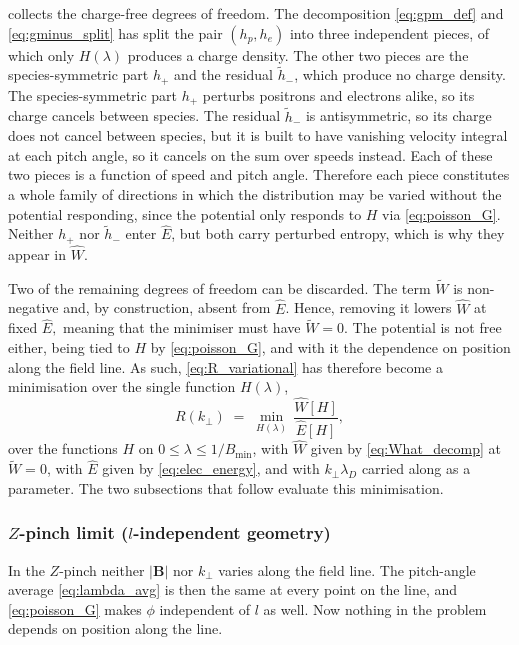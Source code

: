 \documentclass{jpp}
\newcommand{\bB}{\mathbf{B}}
\newcommand{\kperp}{k_\perp}
\newcommand{\lambdaD}{\lambda_D}
\begin{document}
collects the charge-free degrees of freedom. The decomposition \cref{eq:gpm_def} and \cref{eq:gminus_split} has split the pair $(h_p, h_e)$ into three independent pieces, of which only $H(\lambda)$ produces a charge density. The other two pieces are the species-symmetric part $h_+$ and the residual $\tilde h_-$, which produce no charge density. The species-symmetric part $h_+$ perturbs positrons and electrons alike, so its charge cancels between species. The residual $\tilde h_-$ is antisymmetric, so its charge does not cancel between species, but it is built to have vanishing velocity integral at each pitch angle, so it cancels on the sum over speeds instead. Each of these two pieces is a function of speed and pitch angle. Therefore each piece constitutes a whole family of directions in which the distribution may be varied without the potential responding, since the potential only responds to $H$ via \cref{eq:poisson_G}. Neither $h_+$ nor $\tilde h_-$ enter $\hat E$, but both carry perturbed entropy, which is why they appear in $\hat W$.

Two of the remaining degrees of freedom can be discarded. The term $\tilde W$ is non-negative and, by construction, absent from $\hat E$. Hence, removing it lowers $\hat W$ at fixed $\hat E,$ meaning that the minimiser must have $\tilde W = 0$. The potential is not free either, being tied to $H$ by \cref{eq:poisson_G}, and with it the dependence on position along the field line. As such, \cref{eq:R_variational} has therefore become a minimisation over the single function $H(\lambda)$,
\begin{equation}\label{eq:R_reduced}
R(\kperp) \;=\; \min_{H(\lambda)}\, \frac{\hat W[H]}{\hat E[H]} ,
\end{equation}
over the functions $H$ on $0 \leq \lambda \leq 1/B_\mathrm{min}$, with $\hat W$ given by \cref{eq:What_decomp} at $\tilde W = 0$, with $\hat E$ given by \cref{eq:elec_energy}, and with $\kperp\lambdaD$ carried along as a parameter. The two subsections that follow evaluate this minimisation.

\subsubsection{$Z$-pinch limit (\texorpdfstring{$l$}{l}-independent geometry)}\label{sec:fjortoft_zpinch}

In the $Z$-pinch neither $|\bB|$ nor $\kperp$ varies along the field line. The pitch-angle average \cref{eq:lambda_avg} is then the same at every point on the line, and \cref{eq:poisson_G} makes $\phi$ independent of $l$ as well. Now nothing in the problem depends on position along the line. 
\end{document}
